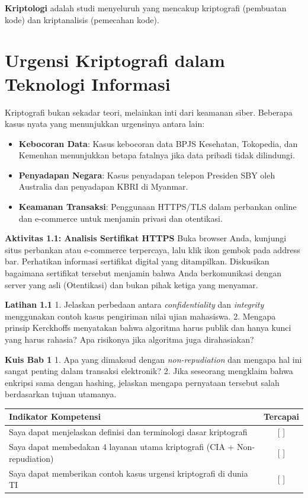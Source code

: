 \documentclass[../main.tex]{subfiles}
\begin{document}
\textbf{Kriptologi} adalah studi menyeluruh yang mencakup kriptografi (pembuatan kode) dan kriptanalisis (pemecahan kode).

\section{Urgensi Kriptografi dalam Teknologi Informasi}
Kriptografi bukan sekadar teori, melainkan inti dari keamanan siber. Beberapa kasus nyata yang menunjukkan urgensinya antara lain:
\begin{itemize}
    \item \textbf{Kebocoran Data}: Kasus kebocoran data BPJS Kesehatan, Tokopedia, dan Kemenhan menunjukkan betapa fatalnya jika data pribadi tidak dilindungi.
    \item \textbf{Penyadapan Negara}: Kasus penyadapan telepon Presiden SBY oleh Australia dan penyadapan KBRI di Myanmar.
    \item \textbf{Keamanan Transaksi}: Penggunaan HTTPS/TLS dalam perbankan online dan e-commerce untuk menjamin privasi dan otentikasi.
\end{itemize}

\begin{obeactivity}
\textbf{Aktivitas 1.1: Analisis Sertifikat HTTPS}
Buka browser Anda, kunjungi situs perbankan atau e-commerce terpercaya, lalu klik ikon gembok pada address bar. Perhatikan informasi sertifikat digital yang ditampilkan. Diskusikan bagaimana sertifikat tersebut menjamin bahwa Anda berkomunikasi dengan server yang asli (Otentikasi) dan bukan pihak ketiga yang menyamar.
\end{obeactivity}

\begin{obereflection}
\textbf{Latihan 1.1}
1. Jelaskan perbedaan antara \textit{confidentiality} dan \textit{integrity} menggunakan contoh kasus pengiriman nilai ujian mahasiswa.
2. Mengapa prinsip Kerckhoffs menyatakan bahwa algoritma harus publik dan hanya kunci yang harus rahasia? Apa risikonya jika algoritma juga dirahasiakan?
\end{obereflection}

\begin{obeassessment}
\textbf{Kuis Bab 1}
1. Apa yang dimaksud dengan \textit{non-repudiation} dan mengapa hal ini sangat penting dalam transaksi elektronik?
2. Jika seseorang mengklaim bahwa enkripsi sama dengan hashing, jelaskan mengapa pernyataan tersebut salah berdasarkan tujuan utamanya.
\end{obeassessment}

\begin{competencychecklist}
\begin{tabularx}{\linewidth}{|X|c|}
\hline
Indikator Kompetensi & Tercapai \\
\hline
Saya dapat menjelaskan definisi dan terminologi dasar kriptografi & [ ] \\
\hline
Saya dapat membedakan 4 layanan utama kriptografi (CIA + Non-repudiation) & [ ] \\
\hline
Saya dapat memberikan contoh kasus urgensi kriptografi di dunia TI & [ ] \\
\hline
\end{tabularx}
\end{competencychecklist}
\end{document}

